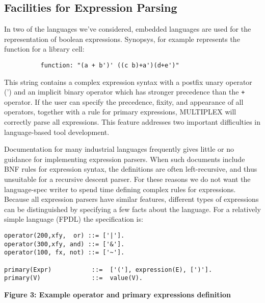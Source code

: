 \subsection{Facilities for Expression Parsing}

In two of the languages we've considered, embedded languages
are used for the representation of boolean expressions.
Synopsys, for example represents the function
for a library cell:
\begin{verbatim}
          function: "(a + b')' ((c b)+a')(d+e')"
\end{verbatim}
This string contains a complex expression syntax
with a postfix unary operator (') and an implicit binary
operator which has stronger
precedence than the {\tt +} operator.
If the user can specify
the precedence, fixity, and appearance of all operators,
together with a rule for primary expressions,
MULTIPLEX will correctly parse all
expressions. This feature addresses two important 
difficulties in language-based tool development.

Documentation for many industrial languages
frequently gives little or no guidance for
implementing expression parsers. When such documents
include BNF rules for expression syntax, the
definitions are often left-recursive, and thus
unsuitable for a recursive descent parser.
For these reasons we do not want the language-spec writer
to spend time defining complex rules for
expressions. Because all expression parsers have similar
features, different types of expressions can be distinguished
by specifying a few facts about the language. For 
a relatively simple language (FPDL) the specification is:
\begin{verbatim}
operator(200,xfy,  or) ::= ['|'].
operator(300,xfy, and) ::= ['&'].
operator(100, fx, not) ::= ['~'].

primary(Expr)           ::=  ['('], expression(E), [')'].
primary(V)              ::=  value(V).
\end{verbatim}

\centerline{\bf Figure 3: Example operator and primary expressions definition}

